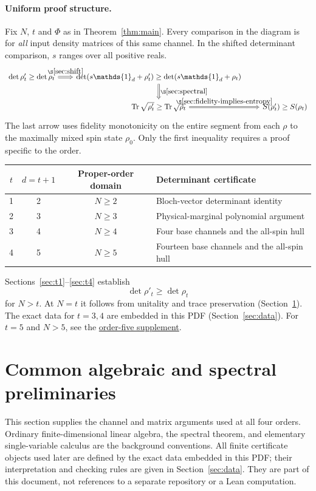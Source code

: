 \documentclass[11pt,a4paper]{article}
\newcommand{\Tr}{\operatorname{Tr}}
\newcommand{\id}{\mathds{1}}
\begin{document}
\paragraph{Uniform proof structure.}
Fix $N$, $t$ and $\Phi$ as in Theorem~\ref{thm:main}. Every comparison in
the diagram is for \emph{all} input density matrices of this same channel.
In the shifted determinant comparison, $s$ ranges over all positive reals.
\[
\begin{tikzcd}[column sep=2em,row sep=2.1em]
 \det\rho'_t\ge\det\rho_t \arrow[r,Rightarrow,"{\S\ref{sec:shift}}"] &
 \det(s\id_d+\rho'_t)\ge\det(s\id_d+\rho_t)
    \arrow[d,Rightarrow,"{\S\ref{sec:spectral}}"] & \\
 & \Tr\sqrt{\rho'_t}\ge\Tr\sqrt{\rho_t}
    \arrow[r,Rightarrow,"{\S\ref{sec:fidelity-implies-entropy}}"] &
 S(\rho'_t)\ge S(\rho_t)
\end{tikzcd}
\]
The last arrow uses fidelity monotonicity on the entire segment from
each $\rho$ to the maximally mixed spin state $\rho_0$. Only the first
inequality requires a proof specific to the order.
\begin{center}
\begin{tabular}{@{}cccl@{}}
\toprule
$t$&$d=t+1$&Proper-order domain&Determinant certificate\\
\midrule
1&2&$N\ge2$&Bloch-vector determinant identity\\
2&3&$N\ge3$&Physical-marginal polynomial argument\\
3&4&$N\ge4$&Four base channels and the all-spin hull\\
4&5&$N\ge5$&Fourteen base channels and the all-spin hull\\
\bottomrule
\end{tabular}
\end{center}


Sections~\ref{sec:t1}--\ref{sec:t4} establish
\begin{equation}\label{eq:det}
 \det\rho'_t\ge\det\rho_t
\end{equation}
for $N>t$. At $N=t$ it follows from unitality and trace preservation
(Section~\ref{sec:prelim}). The exact data for $t=3,4$ are embedded in
this PDF (Section~\ref{sec:data}). For $t=5$ and $N>5$, see the
\href{https://github.com/aenictusGitHub/mixed-spin-anticoherence/tree/main/su2-order-five-monotonicity}{order-five supplement}.

\section{Common algebraic and spectral preliminaries}\label{sec:prelim}
This section supplies the channel and matrix arguments used at all four
orders. Ordinary finite-dimensional linear algebra, the spectral theorem,
and elementary single-variable calculus are the background conventions.
All finite certificate objects used later are defined by the exact data
embedded in this PDF; their interpretation and checking rules are given
in Section~\ref{sec:data}. They are part of this document, not references
to a separate repository or a Lean computation.
\end{document}
